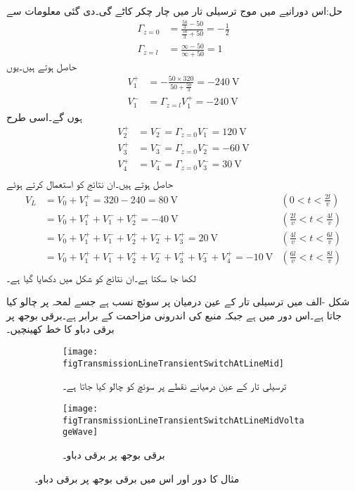 حل:اس دورانیے میں موج ترسیلی تار میں چار چکر کاٹے گی۔دی گئی معلومات سے
\begin{align*}
\Gamma_{z=0}&=\frac{\frac{50}{3}-50}{\frac{50}{3}+50}=-\frac{1}{2}\\
\Gamma_{z=l}&=\frac{\infty - 50}{\infty + 50}=1
\end{align*}
حاصل ہوتے ہیں۔یوں
\begin{align*}
V_1^+&=-\frac{50 \times 320}{50+\frac{50}{3}}=\SI{-240}{\volt}\\
V_1^-&=\Gamma_{z=l} V_1^+=\SI{-240}{\volt}
\end{align*}
ہوں گے۔اسی طرح
\begin{align*}
V_2^+&=V_2^-=\Gamma_{z=0} V_1^-=\SI{120}{\volt}\\
V_3^+&=V_3^-=\Gamma_{z=0} V_2^-=\SI{-60}{\volt}\\
V_4^+&=V_4^-=\Gamma_{z=0} V_3^-=\SI{30}{\volt}\\
\end{align*}
حاصل ہوتے ہیں۔ان نتائج کو استعمال کرتے ہوئے
\begin{align*}
V_L&=V_0+V_1^+=320-240=\SI{80}{\volt} & (0<t<\tfrac{2l}{v})\\
&=V_0+V_1^+ +V_1^-+V_2^+=\SI{-40}{\volt} & (\tfrac{2l}{v}<t<\tfrac{4l}{v})\\
&=V_0+V_1^+ +V_1^-+V_2^+ +V_2^-+V_3^+=\SI{20}{\volt} & (\tfrac{4l}{v}<t<\tfrac{6l}{v})\\
&=V_0+V_1^+ +V_1^-+V_2^+ +V_2^-+V_3^+ +V_3^-+V_4^+=\SI{-10}{\volt} &  (\tfrac{6l}{v}<t<\tfrac{8l}{v})\\
\end{align*}
لکھا جا سکتا ہے۔ان نتائج کو شکل  میں دکھایا گیا ہے۔

شکل -الف میں ترسیلی تار کے عین درمیان   پر سوئچ نسب ہے جسے لمحہ  پر چالو کیا جاتا ہے۔اس دور میں  ہے جبکہ منبع کی اندرونی مزاحمت  کے برابر ہے۔برقی بوجھ پر برقی دباو کا خط کھینچیں۔
\begin{figure}
\centering
\begin{subfigure}{0.8\textwidth}
\centering
\texttt{[image: figTransmissionLineTransientSwitchAtLineMid]}
\caption{ترسیلی تار کے عین درمیانے نقطے پر سوئچ کو چالو کیا جاتا ہے۔}
\end{subfigure}

\begin{subfigure}{0.8\textwidth}
\centering
\texttt{[image: figTransmissionLineTransientSwitchAtLineMidVoltageWave]}
\caption{برقی بوجھ پر برقی دباو۔}
\end{subfigure}
\caption{مثال  کا دور اور اس میں برقی بوجھ پر برقی دباو۔}
\label{شکل_ترسیلی_مثال_سوئچ_درمیان}
\end{figure}

